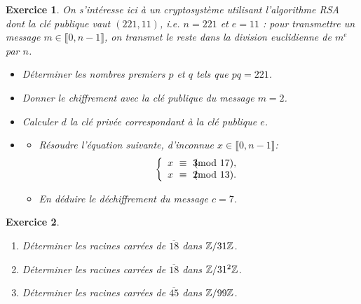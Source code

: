 \documentclass[11pt,a4paper]{article}
\newtheorem{ex}{Exercice}
\begin{document}
\begin{ex}\label{RSA}
On s'intéresse ici à un cryptosystème utilisant l'algorithme RSA dont la clé publique vaut $(221,11)$, i.e. $n=221$ et $e=11$ : pour transmettre un message $m\in \llbracket 0,n-1\rrbracket$, on transmet le reste dans la division euclidienne de $m^e$ par $n$.
    
\begin{itemize}
\item[$1.$] Déterminer les nombres premiers $p$ et $q$ tels que $pq=221$.
\item[$2.$] Donner le chiffrement avec la clé publique du message $m=2$.
\item[$3.$] Calculer $d$ la clé privée correspondant à la clé publique $e$.
\item[$4.$]
\begin{itemize}
\item[$(a)$]
 Résoudre  l'équation suivante, d'inconnue $x\in \llbracket 0,n-1\rrbracket$:
\begin{eqnarray*}
 \left \{  \begin{array}{c}
\md{x}{3}{17},\\
\md{x}{2}{13} . \end{array}  \right. 
\end{eqnarray*}
\item[$(b)$]
En déduire le déchiffrement du message $c=7$.
\end{itemize}
\end{itemize}

\end{ex}










\begin{ex}\label{e_rac_car}

\begin{enumerate}
\item Déterminer les racines carrées de $\overline{18}$ dans $\mathbb{Z}/31\mathbb{Z}$. 

\item Déterminer les racines carrées de $\overline{18}$ dans $\mathbb{Z}/31^2\mathbb{Z}$. 


\item Déterminer les racines carrées de $\overline{45}$ dans $\mathbb{Z}/99\mathbb{Z}$. 
\end{enumerate}

\end{ex}
\end{document}
